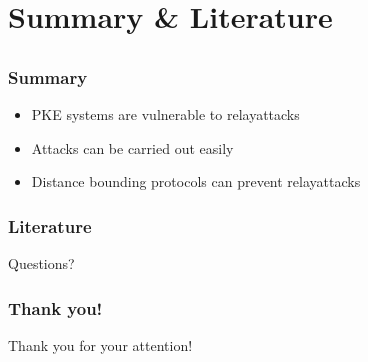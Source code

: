\documentclass[12pt]{beamer}
\begin{document}
\section{Summary \& Literature}
\subsection*{}
	\begin{frame}
		\frametitle{Summary}
			\begin{itemize}
				\item PKE systems are vulnerable to relayattacks 
				\item Attacks can be carried out easily
				\item Distance bounding protocols can prevent relayattacks
			\end{itemize}
	\end{frame}
	\begin{frame}
	\frametitle{Literature}
	\tiny
	\nocite{*}
		\def\newblock{}
		
		
	\end{frame}
	
	\begin{frame}
		\begin{center}
			Questions?
		\end{center}
	\end{frame}	

	\begin{frame}
		\frametitle{Thank you!}
		\begin{center}
			Thank you for your attention!
		\end{center}
	\end{frame}	
\end{document}
